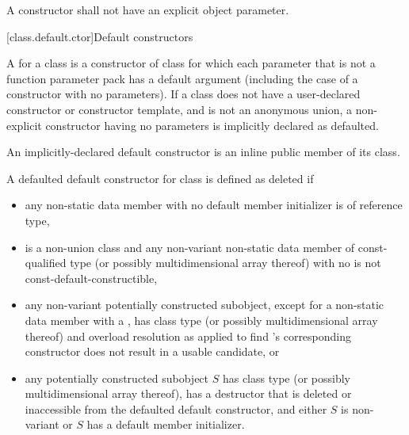 \pnum
A constructor shall not have an explicit object parameter.

[class.default.ctor]{Default constructors}

\pnum
{}%
%
A  for a class 
is a constructor of class 
for which each parameter
that is not a function parameter pack
has a default argument
(including the case of a constructor with no parameters).
%
If a class does not have
a user-declared constructor or constructor template,
and  is not an anonymous union,
a non-explicit constructor having no parameters is implicitly declared
as defaulted.

An implicitly-declared default constructor is an
inline public member of its class.

\pnum
A defaulted default constructor for class  is defined as deleted if
\begin{itemize}
\item any non-static data member with no default member initializer is
of reference type,

\item {} is a non-union class and
any non-variant non-static data member of const-qualified type
(or possibly multidimensional array thereof)
with no 
is not const-default-constructible,

\item any non-variant potentially constructed subobject, except for a non-static data member
with a ,
has class type  (or possibly multidimensional array thereof)
and overload resolution
as applied to find 's corresponding constructor
does not result in a usable candidate, or

\item any potentially constructed subobject $S$ has
class type  (or possibly multidimensional array thereof),
 has
a destructor that is deleted or inaccessible from the defaulted default
constructor, and
either $S$ is non-variant or $S$ has a default member initializer.
\end{itemize}

